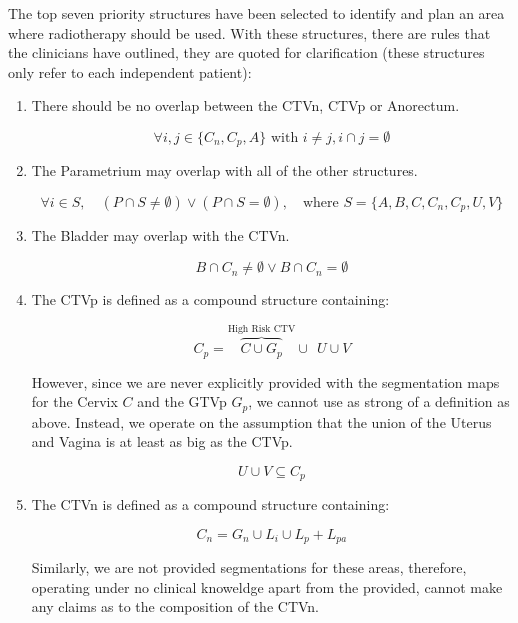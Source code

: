 \documentclass[12pt,twoside]{report}
\begin{document}

The top seven priority structures have been selected to identify and plan an area where radiotherapy should be used. With these structures, there are rules that the clinicians have outlined, they are quoted for clarification (these structures only refer to each independent patient):

\begin{enumerate}
  \item There should be no overlap between the CTVn, CTVp or Anorectum.

        \begin{equation}\label{eq:ctvn-ctvp-anorectum}
          \forall{i,j \in \{C_n, C_p, A\}}\text{ with } i \neq j, i \cap j = \emptyset
        \end{equation}

  \item The Parametrium may overlap with all of the other structures.

        \begin{equation}
          \forall i \in S, \quad (P \cap S \neq \emptyset) \vee (P \cap S = \emptyset), \quad \text{where } S = \{A, B, C, C_n, C_p, U, V\}
        \end{equation}

  \item The Bladder may overlap with the CTVn.

        \begin{equation}
          B \cap C_n \neq \emptyset \vee B \cap C_n = \emptyset\label{eq:ctvn}
        \end{equation}

  \item The CTVp is defined as a compound structure containing:

        \begin{equation}
          C_p = \overbrace{C \cup G_p}^{\text{High Risk CTV}} \cup \ \ U \cup V\label{eq:ctvp1}
        \end{equation}

  However, since we are never explicitly provided with the segmentation maps for the Cervix $C$ and the GTVp $G_p$, we cannot use as strong of a definition as above. Instead, we operate on the assumption that the union of the Uterus and Vagina is at least as big as the CTVp.

        \begin{equation}
          U \cup V \subseteq C_p\label{eq:ctvp2}
        \end{equation}

  \item The CTVn is defined as a compound structure containing:

        \begin{equation}
          C_n = G_n \cup L_i \cup L_p + L_{pa}
        \end{equation}

  Similarly, we are not provided segmentations for these areas, therefore, operating under no clinical knoweldge apart from the provided, cannot make any claims as to the composition of the CTVn.

\end{enumerate}
\end{document}
